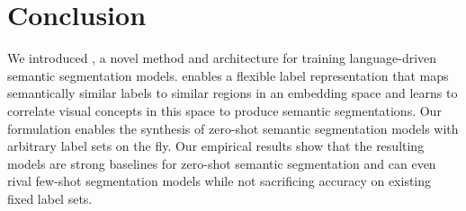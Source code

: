 \section{Conclusion}
\label{sec:conclusion}
\vspace{-0.1in}
We introduced \methodname{}, a novel method and architecture for training language-driven semantic segmentation models. \methodname{} enables a flexible label representation that maps semantically similar labels to similar regions in an embedding space and learns to correlate visual concepts in this space to produce semantic segmentations. Our formulation enables the synthesis of zero-shot semantic segmentation models with arbitrary label sets on the fly. Our empirical results show that the resulting models are strong baselines for zero-shot semantic segmentation and can even rival few-shot segmentation models while not sacrificing accuracy on existing fixed label sets. 